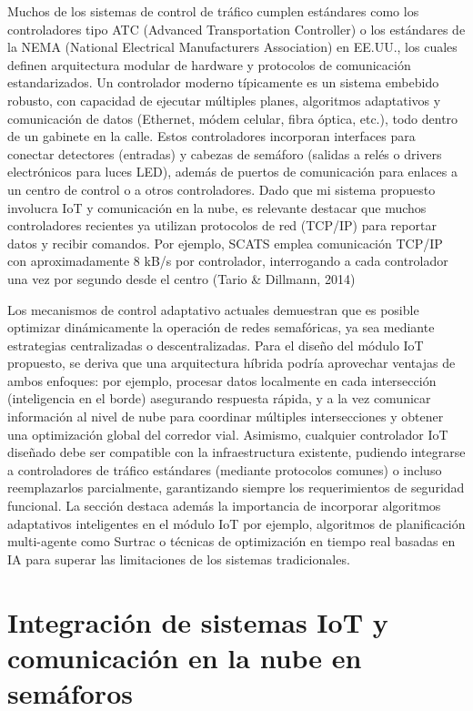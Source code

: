 \documentclass[12pt,a4paper,oneside]{report}
\begin{document}
Muchos de los sistemas de control de tráfico cumplen estándares como los controladores tipo ATC (Advanced Transportation Controller) o los estándares de la NEMA (National Electrical Manufacturers Association) en EE.UU., los cuales definen arquitectura modular de hardware y protocolos de comunicación estandarizados. Un controlador moderno típicamente es un sistema embebido robusto, con capacidad de ejecutar múltiples planes, algoritmos adaptativos y comunicación de datos (Ethernet, módem celular, fibra óptica, etc.), todo dentro de un gabinete en la calle. Estos controladores incorporan interfaces para conectar detectores (entradas) y cabezas de semáforo (salidas a relés o drivers electrónicos para luces LED), además de puertos de comunicación para enlaces a un centro de control o a otros controladores. Dado que mi sistema propuesto involucra IoT y comunicación en la nube, es relevante destacar que muchos controladores recientes ya utilizan protocolos de red (TCP/IP) para reportar datos y recibir comandos. Por ejemplo, SCATS emplea comunicación TCP/IP con aproximadamente 8 kB/s por controlador, interrogando a cada controlador una vez por segundo desde el centro\hspace{0pt} (Tario \& Dillmann, 2014)

Los mecanismos de control adaptativo actuales demuestran que es posible optimizar dinámicamente la operación de redes semafóricas, ya sea mediante estrategias centralizadas o descentralizadas. Para el diseño del módulo IoT propuesto, se deriva que una arquitectura híbrida podría aprovechar ventajas de ambos enfoques: por ejemplo, procesar datos localmente en cada intersección (inteligencia en el borde) asegurando respuesta rápida, y a la vez comunicar información al nivel de nube para coordinar múltiples intersecciones y obtener una optimización global del corredor vial. Asimismo, cualquier controlador IoT diseñado debe ser compatible con la infraestructura existente, pudiendo integrarse a controladores de tráfico estándares (mediante protocolos comunes) o incluso reemplazarlos parcialmente, garantizando siempre los requerimientos de seguridad funcional. La sección destaca además la importancia de incorporar algoritmos adaptativos inteligentes en el módulo IoT por ejemplo, algoritmos de planificación multi-agente como Surtrac o técnicas de optimización en tiempo real basadas en IA para superar las limitaciones de los sistemas tradicionales.

\section{Integración de sistemas IoT y comunicación en la nube en semáforos}\label{integraciuxf3n-de-sistemas-iot-y-comunicaciuxf3n-en-la-nube-en-semuxe1foros}
\end{document}
